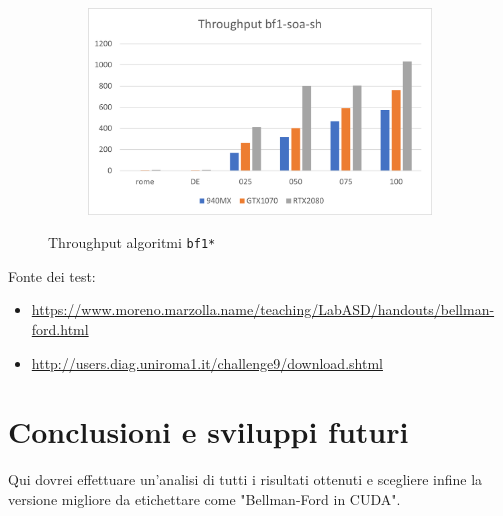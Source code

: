 \documentclass[12pt,a4paper]{book} %
\begin{document}
\begin{figure}[b]
\begin{subfigure}{.5\textwidth}
		\end{subfigure}%
		\begin{subfigure}{.5\textwidth}
			\centering
			\includegraphics[width=\textwidth]{throughput_bf1-soa-sh}
		\end{subfigure}
		\caption{Throughput algoritmi \texttt{bf1*}}
	\end{figure}
	
	Fonte dei test:
	\begin{itemize}
		\item \url{https://www.moreno.marzolla.name/teaching/LabASD/handouts/bellman-ford.html}
		\item \url{http://users.diag.uniroma1.it/challenge9/download.shtml}
	\end{itemize}
	
	\chapter*{Conclusioni e sviluppi futuri}
	\label{section:end}
	Qui dovrei effettuare un'analisi di tutti i risultati ottenuti e scegliere infine la versione migliore da etichettare come "Bellman-Ford in CUDA".
	
	\printbibliography
	
\end{document}

